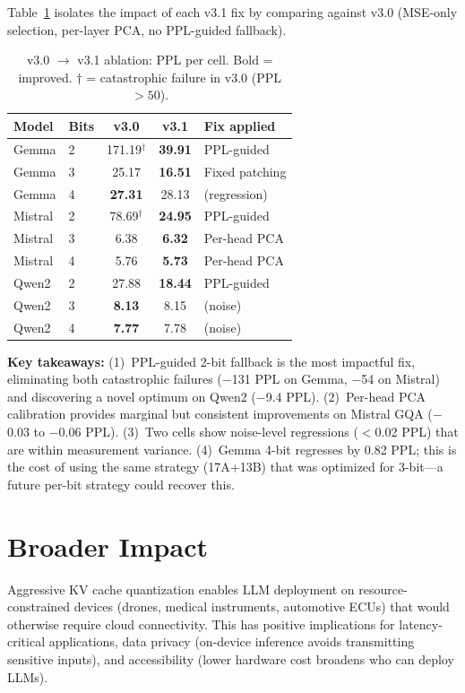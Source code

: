 \documentclass{article}
\begin{document}
Table~\ref{tab:v3_ablation} isolates the impact of each v3.1 fix by
comparing against v3.0 (MSE-only selection, per-layer PCA, no
PPL-guided fallback).

\begin{table}[t]
\centering
\small
\caption{v3.0 $\to$ v3.1 ablation: PPL per cell. Bold = improved.
$\dagger$ = catastrophic failure in v3.0 (PPL $> 50$).}
\label{tab:v3_ablation}
\setlength{\tabcolsep}{4pt}
\begin{tabular}{ll|cc|l}
\toprule
Model & Bits & v3.0 & \textbf{v3.1} & Fix applied \\
\midrule
Gemma   & 2 & 171.19$^\dagger$ & \textbf{39.91} & PPL-guided \\
Gemma   & 3 & 25.17 & \textbf{16.51} & Fixed patching \\
Gemma   & 4 & \textbf{27.31} & 28.13 & (regression) \\
\midrule
Mistral & 2 & 78.69$^\dagger$ & \textbf{24.95} & PPL-guided \\
Mistral & 3 & 6.38 & \textbf{6.32} & Per-head PCA \\
Mistral & 4 & 5.76 & \textbf{5.73} & Per-head PCA \\
\midrule
Qwen2   & 2 & 27.88 & \textbf{18.44} & PPL-guided \\
Qwen2   & 3 & \textbf{8.13} & 8.15 & (noise) \\
Qwen2   & 4 & \textbf{7.77} & 7.78 & (noise) \\
\bottomrule
\end{tabular}
\end{table}

\textbf{Key takeaways:} (1)~PPL-guided 2-bit fallback is the most
impactful fix, eliminating both catastrophic failures ($-$131 PPL on
Gemma, $-$54 on Mistral) and discovering a novel optimum on Qwen2
($-$9.4 PPL). (2)~Per-head PCA calibration provides marginal but
consistent improvements on Mistral GQA ($-$0.03 to $-$0.06 PPL).
(3)~Two cells show noise-level regressions ($<$0.02 PPL) that are
within measurement variance. (4)~Gemma 4-bit regresses by 0.82 PPL;
this is the cost of using the same strategy (17A+13B) that was
optimized for 3-bit---a future per-bit strategy could recover this.

\section{Broader Impact}

Aggressive KV cache quantization enables LLM deployment on
resource-constrained devices (drones, medical instruments, automotive
ECUs) that would otherwise require cloud connectivity. This has positive
implications for latency-critical applications, data privacy (on-device
inference avoids transmitting sensitive inputs), and accessibility
(lower hardware cost broadens who can deploy LLMs).
\end{document}
